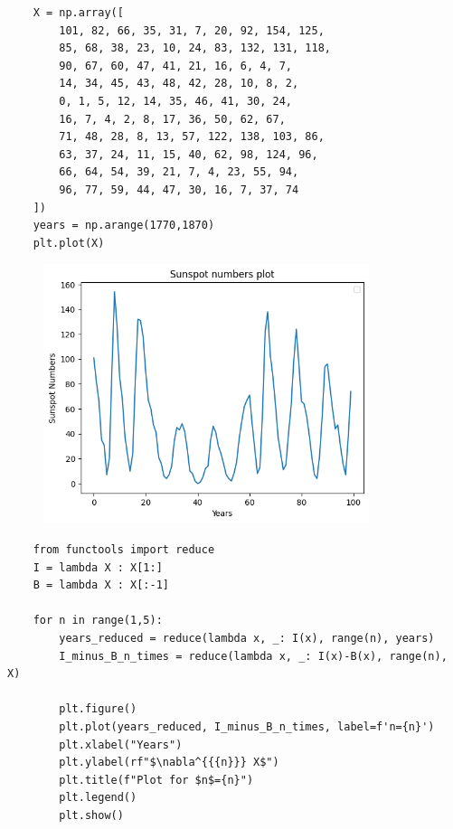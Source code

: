 \begin{verbatim}
    X = np.array([
        101, 82, 66, 35, 31, 7, 20, 92, 154, 125,
        85, 68, 38, 23, 10, 24, 83, 132, 131, 118,
        90, 67, 60, 47, 41, 21, 16, 6, 4, 7, 
        14, 34, 45, 43, 48, 42, 28, 10, 8, 2,
        0, 1, 5, 12, 14, 35, 46, 41, 30, 24,
        16, 7, 4, 2, 8, 17, 36, 50, 62, 67,
        71, 48, 28, 8, 13, 57, 122, 138, 103, 86,
        63, 37, 24, 11, 15, 40, 62, 98, 124, 96,
        66, 64, 54, 39, 21, 7, 4, 23, 55, 94,
        96, 77, 59, 44, 47, 30, 16, 7, 37, 74
    ])
    years = np.arange(1770,1870)
    plt.plot(X)
\end{verbatim}
\begin{figure}[H]
    \centering
    \includegraphics[width=0.85\textwidth]{../pictures/image6.png}
\end{figure}

\begin{verbatim}
    from functools import reduce
    I = lambda X : X[1:]
    B = lambda X : X[:-1]

    for n in range(1,5):
        years_reduced = reduce(lambda x, _: I(x), range(n), years)
        I_minus_B_n_times = reduce(lambda x, _: I(x)-B(x), range(n), X)

        plt.figure()
        plt.plot(years_reduced, I_minus_B_n_times, label=f'n={n}')
        plt.xlabel("Years")
        plt.ylabel(rf"$\nabla^{{{n}}} X$")
        plt.title(f"Plot for $n$={n}")
        plt.legend()
        plt.show()
\end{verbatim}


